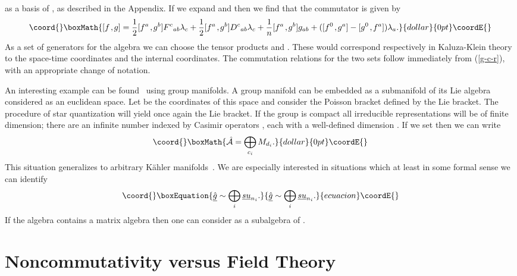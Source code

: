 \documentclass[a4paper,12pt]{article}
\def\h#1{\hat #1}
\def\c#1{{\cal #1}}
\def\k{\kern-.1em\mathbin{,}\kern-.1em}
\providecommand{\initiate}{\setcounter{equation}{0}}
\begin{document}
as a basis of \coordHE{}, as described in the Appendix. If we expand 
\coordHE{} and \coordHE{} then we find that
the commutator is given by
$$\coord{}\boxMath{
[f\k g] = \frac 12 [f^a \k g^b] F^c{}_{ab} \lambda_c + \frac 12
[f^a \k g^b] D^c{}_{ab} \lambda_c + \frac 1n [f^a \k g^b] g_{ab} +
([f^0\k g^a] - [g^0\k f^a]) \lambda_a.
}{dollar}{0pt}\coordE{}$$
As a set of generators for the algebra we can choose the tensor
products \coordHE{} and \coordHE{}. These would
correspond respectively in Kaluza-Klein theory to the space-time
coordinates and the internal coordinates. The commutation relations
for the two sets follow immediately from (\ref{g-c-r}), with an
appropriate change of notation.

An interesting example can be found~\cite{JurSch00} using group
manifolds. A group manifold \coordHE{} can be embedded as a submanifold of
its Lie algebra considered as an euclidean space. Let \coordHE{} be the
coordinates of this space and consider the Poisson bracket defined by
the Lie bracket. The procedure of star quantization will yield once
again the Lie bracket. If the group is compact all irreducible
representations will be of finite dimension; there are an infinite
number indexed by Casimir operators \coordHE{}, each with a well-defined
dimension \coordHE{}. If we set \myHighlight{$\c{A} = \c{C}(M_G)$}\coordHE{} then we can write
$$\coord{}\boxMath{
\h{\c}{A} = \bigoplus_{c_i} M_{d_i}.
}{dollar}{0pt}\coordE{}$$
This situation generalizes to arbitrary K\"ahler
manifolds~\cite{Sch99}. We are especially interested in situations which
at least in some formal sense we can identify
\begin{equation}\coord{}\boxEquation{
\underline{\h{g}} \sim \bigoplus_{i} \underline{su}_{n_i}.
\label{sum}
}{
\underline{\h{g}} \sim \bigoplus_{i} \underline{su}_{n_i}.
}{ecuacion}\coordE{}\end{equation}
If the algebra \myHighlight{$\h{\c}{A}$}\coordHE{} contains a matrix algebra \coordHE{} then one
can consider \coordHE{} as a subalgebra of
\myHighlight{$\underline{\h{g}}$}\coordHE{}.


\initiate
\section{Noncommutativity versus Field Theory}
\end{document}
